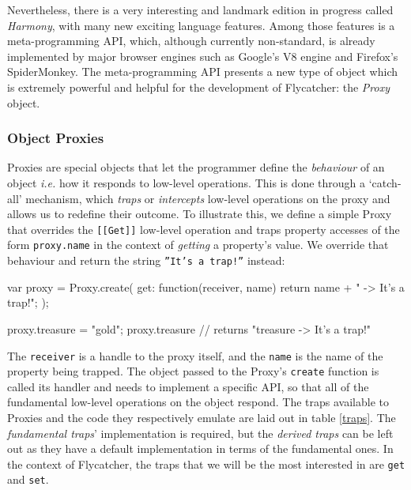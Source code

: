 Nevertheless, there is a very interesting and landmark edition in progress called \emph{Harmony}, with many new exciting language features. Among those features is a meta-programming API, which, although currently non-standard, is already implemented by major browser engines such as Google's V8 engine and Firefox's SpiderMonkey. The meta-programming API presents a new type of object which is extremely powerful and helpful for the development of \textsf{Flycatcher}: the \emph{Proxy} object.

\subsubsection{Object Proxies}
Proxies are special objects that let the programmer define the \emph{behaviour} of an object \emph{i.e.} how it responds to low-level operations. This is done through a `catch-all' mechanism, which \emph{traps} or \emph{intercepts} low-level operations on the proxy and allows us to redefine their outcome. To illustrate this, we define a simple Proxy that overrides the \texttt{[[Get]]} low-level operation and traps property accesses of the form \texttt{proxy.name} in the context of \emph{getting} a property's value. We override that behaviour and return the string \texttt{''It's a trap!''} instead:

\begin{code}[caption=Object Proxy,label=objproxy]
var proxy = Proxy.create({
  get: function(receiver, name) {
    return name + " -> It's a trap!";
  }
});

proxy.treasure = "gold";
proxy.treasure // returns "treasure -> It's a trap!"
\end{code}

The \texttt{receiver} is a handle to the proxy itself, and the \texttt{name} is the name of the property being trapped. The object passed to the Proxy's \texttt{create} function is called its handler and needs to implement a specific API, so that all of the fundamental low-level operations on the object respond. The traps available to Proxies and the code they respectively emulate are laid out in table \ref{traps}. The \emph{fundamental traps}' implementation is required, but the \emph{derived traps} can be left out as they have a default implementation in terms of the fundamental ones. In the context of \textsf{Flycatcher}, the traps that we will be the most interested in are \texttt{get} and \texttt{set}.

